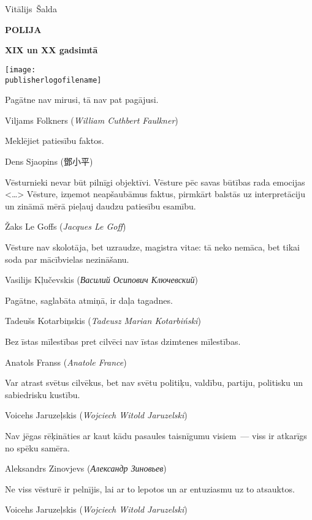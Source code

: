 \documentclass[twoside,a5paper,12pt,fleqn,openany]{extbook}
\newcommand{\publisherlogofilename}{publisher_logo_ru.pdf}
\newcommand{\bookauthor}{Vitālijs~Šalda}
\newcommand{\pltxti}[1]{\textit{\textpolish{#1}}}
\newcommand{\rutxti}[1]{\textit{\textrussian{#1}}}
\newcommand{\frtxti}[1]{\textit{\textfrench{#1}}}
\newcommand{\entxti}[1]{\textit{\textenglish{#1}}}
\newcommand{\zhtxti}[1]{#1}
\newcommand{\citespace}{<\dots{}>}
\begin{document}
% 

\newpage\thispagestyle{plain}~

\begin{titlepage}
{
\centering
{~\par}
\vspace{0.25\textheight}
{\LARGE\bookauthor\par}
\vspace{1.3cm}
{\Huge\textbf{POLIJA}\par}
{\LARGE\textbf{XIX un XX gadsimtā}\par}
\vfill
{\texttt{[image: \\publisherlogofilename]}\par}
}
\end{titlepage}

\epigraph
{Pagātne nav mirusi, tā nav pat pagājusi.}
{Viljams Folkners (\entxti{William Cuthbert Faulkner})}

\epigraph
{Meklējiet patiesību faktos.}
{Dens Sjaopins (\zhtxti{鄧小平})}

\epigraph
{Vēsturnieki nevar būt pilnīgi objektīvi.
Vēsture pēc savas būtības rada emocijas \citespace{}
Vēsture, izņemot neapšaubāmus faktus, pirmkārt balstās uz interpretāciju un zināmā mērā pieļauj daudzu patiesību esamību.}
{Žaks Le Goffs (\frtxti{Jacques Le Goff})}

\epigraph
{Vēsture nav skolotāja, bet uzraudze, magistra vitae: tā neko nemāca, bet tikai soda par mācībvielas nezināšanu.}
{Vasilijs Kļučevskis (\rutxti{Василий Осипович Ключевский})}

\epigraph
{Pagātne, saglabāta atmiņā, ir daļa tagadnes.}
{Tadeušs Kotarbiņskis (\pltxti{Tadeusz Marian Kotarbiński})}

\epigraph
{Bez īstas mīlestības pret cilvēci nav īstas dzimtenes mīlestības.}
{Anatols Franss (\frtxti{Anatole France})}

\newpage

\epigraph
{Var atrast svētus cilvēkus, bet nav svētu politiķu, valdību, partiju, politisku un sabiedrisku kustību.}
{Voicehs Jaruzeļskis (\pltxti{Wojciech Witold Jaruzelski})}

\epigraph
{Nav jēgas rēķināties ar kaut kādu pasaules taisnīgumu visiem~--- viss ir atkarīgs no spēku samēra.}
{Aleksandrs Zinovjevs (\rutxti{Александр Зиновьев})}

\epigraph
{Ne viss vēsturē ir pelnījis, lai ar to lepotos un ar entuziasmu uz to atsauktos.}
{Voicehs Jaruzeļskis (\pltxti{Wojciech Witold Jaruzelski})}
\end{document}
